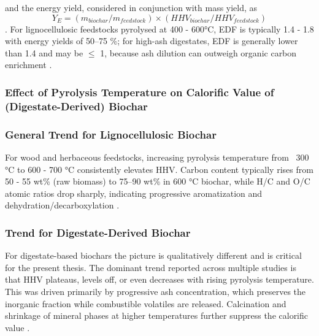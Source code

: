 and the energy yield, considered in conjunction with mass yield, as
\begin{equation}\label{eq:energy-yield}
    Y_E = (m_{biochar} / m_{feedstock}) \times (HHV_{biochar} / HHV_{feedstock})  
\end{equation}
\cite{bridgwater-2011,antal-2003}. For lignocellulosic feedstocks pyrolysed at 400 - 600°C, EDF is typically 1.4 - 1.8 with energy yields of 50–75 \%; for high-ash digestates, EDF is generally lower than 1.4 and may be $\leq$ 1, because ash dilution can outweigh organic carbon enrichment \cite{hung-2017, opatokun-2015}.

\subsubsection{Effect of Pyrolysis Temperature on Calorific Value of (Digestate-Derived) Biochar}


\subsubsection*{General Trend for Lignocellulosic Biochar}
For wood and herbaceous feedstocks, increasing pyrolysis temperature from ~300 °C to 600 - 700 °C consistently elevates HHV. Carbon content typically rises from 50 - 55 wt\% (raw biomass) to 75–90 wt\% in 600 °C biochar, while H/C and O/C atomic ratios drop sharply, indicating progressive aromatization and dehydration/decarboxylation \cite{tag-2016,babu-2024}.

\subsubsection*{Trend for Digestate-Derived Biochar}
For digestate-based biochars the picture is qualitatively different and is critical for the present thesis. The dominant trend reported across multiple studies is that HHV plateaus, levels off, or even decreases with rising pyrolysis temperature. This was driven primarily by progressive ash concentration, which preserves the inorganic fraction while combustible volatiles are released. Calcination and shrinkage of mineral phases at higher temperatures further suppress the calorific value \cite{hung-2017, pecchi-2019}.

\vspace{0.3em}

